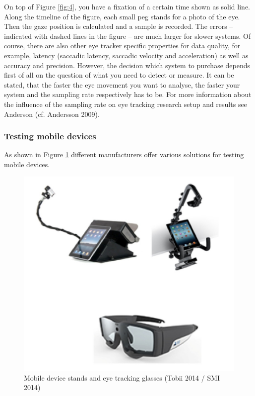 \documentclass[output=paper]{langsci/langscibook}
\begin{document}
On top of Figure \ref{fig:4}, you have a fixation of a certain time shown as solid line. Along the timeline of the figure, each small peg stands for a photo of the eye. Then the gaze position is calculated and a sample is recorded. The errors – indicated with dashed lines in the figure – are much larger for slower systems. Of course, there are also other eye tracker specific properties for data quality, for example, latency (saccadic latency, saccadic velocity and acceleration) as well as accuracy and precision. However, the decision which system to purchase depends first of all on the question of what you need to detect or measure. It can be stated, that the faster the eye movement you want to analyse, the faster your system and the sampling rate respectively has to be. For more information about the influence of the sampling rate on eye tracking research setup and results see Anderson (cf. Andersson 2009). 

\subsubsection{Testing mobile devices}

As shown in Figure \ref{fig:5} different manufacturers offer various solutions for testing mobile devices. 

\begin{figure}[h]
 \includegraphics[width=\textwidth]{figures/Roesener5.png}
 \caption{Mobile device stands and eye tracking glasses (Tobii 2014 / SMI 2014)}
 \label{fig:5}
\end{figure} 
\end{document}
